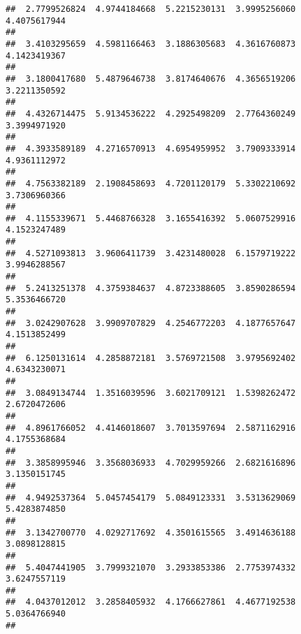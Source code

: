\documentclass[]{article}
\begin{document}
\begin{verbatim}
##  2.7799526824  4.9744184668  5.2215230131  3.9995256060  4.4075617944 
##                                                                       
##  3.4103295659  4.5981166463  3.1886305683  4.3616760873  4.1423419367 
##                                                                       
##  3.1800417680  5.4879646738  3.8174640676  4.3656519206  3.2211350592 
##                                                                       
##  4.4326714475  5.9134536222  4.2925498209  2.7764360249  3.3994971920 
##                                                                       
##  4.3933589189  4.2716570913  4.6954959952  3.7909333914  4.9361112972 
##                                                                       
##  4.7563382189  2.1908458693  4.7201120179  5.3302210692  3.7306960366 
##                                                                       
##  4.1155339671  5.4468766328  3.1655416392  5.0607529916  4.1523247489 
##                                                                       
##  4.5271093813  3.9606411739  3.4231480028  6.1579719222  3.9946288567 
##                                                                       
##  5.2413251378  4.3759384637  4.8723388605  3.8590286594  5.3536466720 
##                                                                       
##  3.0242907628  3.9909707829  4.2546772203  4.1877657647  4.1513852499 
##                                                                       
##  6.1250131614  4.2858872181  3.5769721508  3.9795692402  4.6343230071 
##                                                                       
##  3.0849134744  1.3516039596  3.6021709121  1.5398262472  2.6720472606 
##                                                                       
##  4.8961766052  4.4146018607  3.7013597694  2.5871162916  4.1755368684 
##                                                                       
##  3.3858995946  3.3568036933  4.7029959266  2.6821616896  3.1350151745 
##                                                                       
##  4.9492537364  5.0457454179  5.0849123331  3.5313629069  5.4283874850 
##                                                                       
##  3.1342700770  4.0292717692  4.3501615565  3.4914636188  3.0898128815 
##                                                                       
##  5.4047441905  3.7999321070  3.2933853386  2.7753974332  3.6247557119 
##                                                                       
##  4.0437012012  3.2858405932  4.1766627861  4.4677192538  5.0364766940 
##                                                                       

\end{verbatim}
\end{document}
